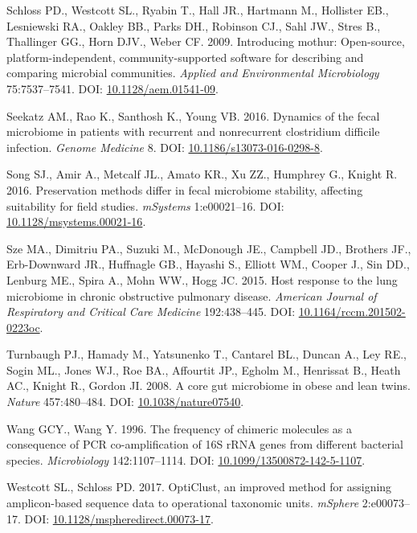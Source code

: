 \documentclass[11pt,]{article}
\begin{document}
\hypertarget{ref-mothur_schloss_2009}{}
Schloss PD., Westcott SL., Ryabin T., Hall JR., Hartmann M., Hollister
EB., Lesniewski RA., Oakley BB., Parks DH., Robinson CJ., Sahl JW.,
Stres B., Thallinger GG., Horn DJV., Weber CF. 2009. Introducing mothur:
Open-source, platform-independent, community-supported software for
describing and comparing microbial communities. \emph{Applied and
Environmental Microbiology} 75:7537--7541. DOI:
\href{https://doi.org/10.1128/aem.01541-09}{10.1128/aem.01541-09}.

\hypertarget{ref-erin_seekatz_2016}{}
Seekatz AM., Rao K., Santhosh K., Young VB. 2016. Dynamics of the fecal
microbiome in patients with recurrent and nonrecurrent clostridium
difficile infection. \emph{Genome Medicine} 8. DOI:
\href{https://doi.org/10.1186/s13073-016-0298-8}{10.1186/s13073-016-0298-8}.

\hypertarget{ref-preservation_Song_2016}{}
Song SJ., Amir A., Metcalf JL., Amato KR., Xu ZZ., Humphrey G., Knight
R. 2016. Preservation methods differ in fecal microbiome stability,
affecting suitability for field studies. \emph{mSystems} 1:e00021--16.
DOI:
\href{https://doi.org/10.1128/msystems.00021-16}{10.1128/msystems.00021-16}.

\hypertarget{ref-Sze2015}{}
Sze MA., Dimitriu PA., Suzuki M., McDonough JE., Campbell JD., Brothers
JF., Erb-Downward JR., Huffnagle GB., Hayashi S., Elliott WM., Cooper
J., Sin DD., Lenburg ME., Spira A., Mohn WW., Hogg JC. 2015. Host
response to the lung microbiome in chronic obstructive pulmonary
disease. \emph{American Journal of Respiratory and Critical Care
Medicine} 192:438--445. DOI:
\href{https://doi.org/10.1164/rccm.201502-0223oc}{10.1164/rccm.201502-0223oc}.

\hypertarget{ref-Turnbaugh2008}{}
Turnbaugh PJ., Hamady M., Yatsunenko T., Cantarel BL., Duncan A., Ley
RE., Sogin ML., Jones WJ., Roe BA., Affourtit JP., Egholm M., Henrissat
B., Heath AC., Knight R., Gordon JI. 2008. A core gut microbiome in
obese and lean twins. \emph{Nature} 457:480--484. DOI:
\href{https://doi.org/10.1038/nature07540}{10.1038/nature07540}.

\hypertarget{ref-Wang1996}{}
Wang GCY., Wang Y. 1996. The frequency of chimeric molecules as a
consequence of PCR co-amplification of 16S rRNA genes from different
bacterial species. \emph{Microbiology} 142:1107--1114. DOI:
\href{https://doi.org/10.1099/13500872-142-5-1107}{10.1099/13500872-142-5-1107}.

\hypertarget{ref-opticlust_Westcott_2017}{}
Westcott SL., Schloss PD. 2017. OptiClust, an improved method for
assigning amplicon-based sequence data to operational taxonomic units.
\emph{mSphere} 2:e00073--17. DOI:
\href{https://doi.org/10.1128/mspheredirect.00073-17}{10.1128/mspheredirect.00073-17}.
\end{document}
